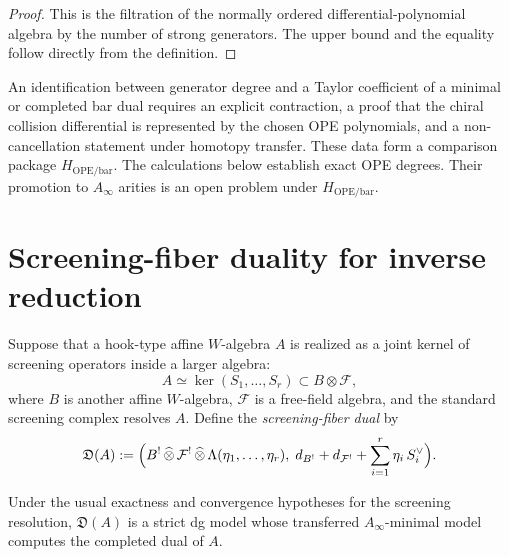 \begin{proof}
This is the filtration of the normally ordered differential-polynomial algebra
by the number of strong generators.  The upper bound and the equality follow
directly from the definition.
\end{proof}

\begin{remark}
An identification between generator degree and a Taylor coefficient of a
minimal or completed bar dual requires an explicit contraction, a proof that
the chiral collision differential is represented by the chosen OPE
polynomials, and a non-cancellation statement under homotopy transfer.  These
data form a comparison package $H_{\mathrm{OPE/bar}}$.  The calculations below
establish exact OPE degrees.  Their promotion to $A_\infty$ arities is an open
problem under $H_{\mathrm{OPE/bar}}$.
\end{remark}

\section{Screening-fiber duality for inverse reduction}

\begin{construction}
\label{constr:screening-fiber-dual}
Suppose that a hook-type affine $W$-algebra $A$ is realized as a joint kernel of
screening operators inside a larger algebra:
\[
A \simeq \ker(S_1,\dots,S_r)\subset B\otimes \mathcal F,
\]
where $B$ is another affine $W$-algebra, $\mathcal F$ is a free-field algebra,
and the standard screening complex resolves $A$. Define the
\emph{screening-fiber dual} by
\[
\mathfrak D(A):=
\Bigl(
B^!\,\widehat\otimes\,\mathcal F^!\,\widehat\otimes\,
\Lambda(\eta_1,\dots,\eta_r),
\;
d_{B^!}+d_{\mathcal F^!}+\sum_{i=1}^r \eta_i\,S_i^\vee
\Bigr).
\]
\end{construction}

\begin{conjecture}
\label{conj:screening-fiber-dual}
Under the usual exactness and convergence hypotheses for the screening
resolution, $\mathfrak D(A)$ is a strict dg model whose transferred
$A_\infty$-minimal model computes the completed dual of $A$.
\end{conjecture}

